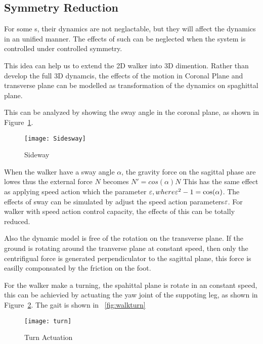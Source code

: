{\subsection{Symmetry Reduction}
For some \dof s, their dynamics are not neglactable, but they will affect the dynamics in an unified manner.
The effects of such \dof can be neglected when the system is controlled under controlled symmetry.

This idea can help us to extend the 2D walker into 3D dimention.
Rather than develop the full 3D dynamcis, the effects of the motion in Coronal Plane and transverse plane can be modelled as transformation of the dynamics on spaghittal plane.


This can be analyzed by showing the sway angle in the coronal plane, as shown in Figure~\ref{fig:sidesway}.
\begin{figure}[!htbp]
  \begin{center}
      \texttt{[image: Sidesway]}
    \caption{Sideway}
    \label{fig:sidesway}
\end{center}
\end{figure}

When the walker have a sway angle $\alpha$, the gravity force on the sagittal phase are lowes thus the external force $N$ becomes $N'=cos(\alpha)N$
This has the same effect as applying speed action which the parameter $\varepsilon, where \varepsilon^2-1=\cos(\alpha)$.
The effects of sway can be simulated by adjust the speed action parameters$\varepsilon$.
For walker with speed action control capacity, the effects of this \dof can be totally reduced.


Also the dynamic model is free of the rotation on the transverse plane.
If the ground is rotating around the tranverse plane at constant speed, then only the centrifigual force is generated perpendiculator to the sagittal plane, this force is easilly componsated by the friction on the foot.

For the walker make a turning, the spahittal plane is rotate in an constant speed, this can be achievied by actuating the yaw joint of the suppoting leg, as shown in Figure~\ref{fig:turn}.
The gait is shown in ~\ref{fig:walkturn}

\begin{figure}[!htbp]
  \begin{center}
      \texttt{[image: turn]}
    \caption{Turn Actuation}
    \label{fig:turn}
\end{center}
\end{figure}



}
